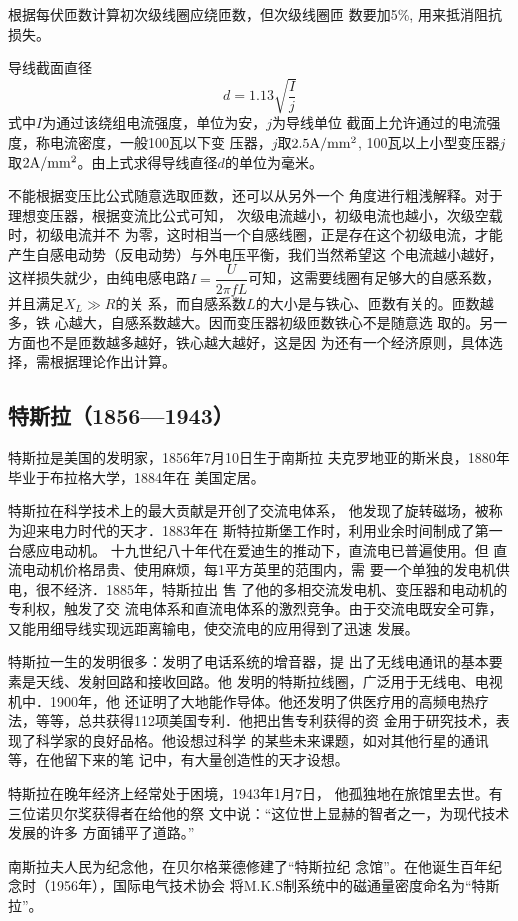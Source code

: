 根据每伏匝数计算初次级线圈应绕匝数，但次级线圈匝
数要加5\%, 用来抵消阻抗损失。

导线截面直径
\[d=1.13\sqrt{\frac{I}{j}}\]
式中$I$为通过该绕组电流强度，单位为安，$j$为导线单位
截面上允许通过的电流强度，称电流密度，一般100瓦以下变
压器，$j$取$2.5{\rm A/mm^2}$, 100瓦以上小型变压器$j$取$2{\rm A/mm^2}$。由上式求得导线直径$d$的单位为毫米。

不能根据变压比公式随意选取匝数，还可以从另外一个
角度进行粗浅解释。对于理想变压器，根据变流比公式可知，
次级电流越小，初级电流也越小，次级空载时，初级电流并不
为零，这时相当一个自感线圈，正是存在这个初级电流，才能
产生自感电动势（反电动势）与外电压平衡，我们当然希望这
个电流越小越好，这样损失就少，由纯电感电路$I=\dfrac{U}{2\pi fL}$可知，这需要线圈有足够大的自感系数，并且满足$X_L\gg R$的关
系，而自感系数$L$的大小是与铁心、匝数有关的。匝数越多，铁
心越大，自感系数越大。因而变压器初级匝数铁心不是随意选
取的。另一方面也不是匝数越多越好，铁心越大越好，这是因
为还有一个经济原则，具体选择，需根据理论作出计算。

\subsection{特斯拉（1856—1943）}

特斯拉是美国的发明家，1856年7月10日生于南斯拉
夫克罗地亚的斯米良，1880年毕业于布拉格大学，1884年在
美国定居。

特斯拉在科学技术上的最大贡献是开创了交流电体系，
他发现了旋转磁场，被称为迎来电力时代的天才．1883年在
斯特拉斯堡工作时，利用业余时间制成了第一台感应电动机。
十九世纪八十年代在爱迪生的推动下，直流电已普遍使用。但
直流电动机价格昂贵、使用麻烦，每1平方英里的范围内，需
要一个单独的发电机供电，很不经济．1885年，特斯拉出 售
了他的多相交流发电机、变压器和电动机的专利权，触发了交
流电体系和直流电体系的激烈竞争。由于交流电既安全可靠，
又能用细导线实现远距离输电，使交流电的应用得到了迅速
发展。

特斯拉一生的发明很多：发明了电话系统的增音器，提
出了无线电通讯的基本要素是天线、发射回路和接收回路。他
发明的特斯拉线圈，广泛用于无线电、电视机中．1900年，他
还证明了大地能作导体。他还发明了供医疗用的高频电热疗
法，等等，总共获得112项美国专利．他把出售专利获得的资
金用于研究技术，表现了科学家的良好品格。他设想过科学
的某些未来课题，如对其他行星的通讯等，在他留下来的笔
记中，有大量创造性的天才设想。

特斯拉在晚年经济上经常处于困境，1943年1月7日，
他孤独地在旅馆里去世。有三位诺贝尔奖获得者在给他的祭
文中说：“这位世上显赫的智者之一，为现代技术发展的许多
方面铺平了道路。”

南斯拉夫人民为纪念他，在贝尔格莱德修建了“特斯拉纪
念馆”。在他诞生百年纪念时（1956年），国际电气技术协会
将M.K.S制系统中的磁通量密度命名为“特斯拉”。













